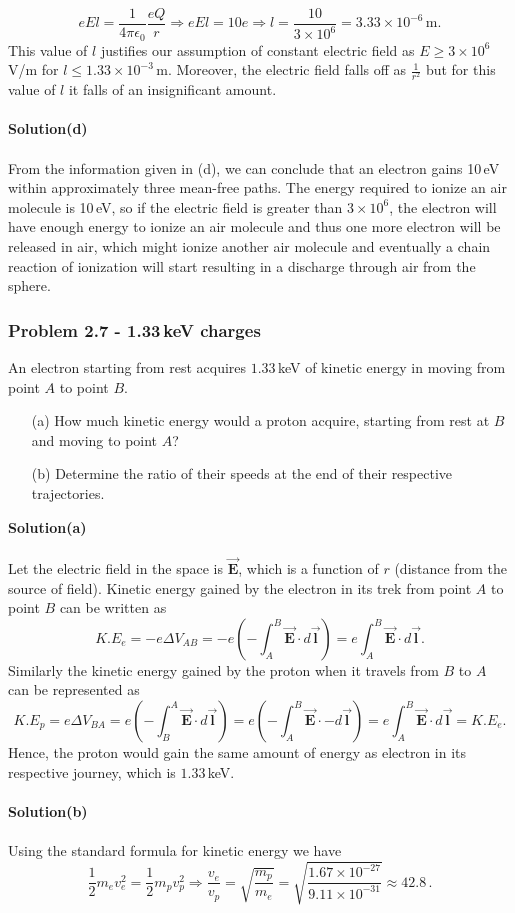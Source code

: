 \documentclass{article}
\begin{document}
\[eEl=\frac{1}{4\pi\epsilon_0}\frac{eQ}{r}\Rightarrow eEl=10e\Rightarrow l=\frac{10}{3\times10^6}=3.33\times10^{-6}\,\text{m}.\]
This value of $l$ justifies our assumption of constant electric field as $E\geq 3\times10^6\,$V/m for $l\leq1.33\times10^{-3}\,$m.
Moreover, the electric field falls off as $\frac{1}{r^2}$ but for this value of $l$ it falls of an insignificant amount.
\\
\\\textbf{Solution(d)}
\\
\\From the information given in (d), we can conclude that an electron gains 10\,eV within approximately three mean-free paths.
The energy required to ionize an air molecule is 10\,eV, so if the electric field is greater than $3\times10^6$, the electron will have enough energy to ionize an air molecule and thus one more electron will be released in air, which might ionize another air molecule and eventually a chain reaction of ionization will start resulting in a discharge through air from the sphere.   

\subsubsection*{Problem 2.7 - 1.33\,keV charges}
An electron starting from rest acquires $1.33$\,keV of
kinetic energy in moving from point $A$ to point $B$.
\begin{enumerate}
    \item[(a)]How much kinetic energy would a proton acquire, starting from rest at $B$ and moving to point $A$? 
    \item[(b)]Determine the ratio of their speeds at the end of their respective trajectories.
\end{enumerate}
\textbf{Solution(a)}
\\
\\Let the electric field in the space is $\Vec{\boldsymbol{E}}$, which is a function of $r$ (distance from the source of field). Kinetic energy gained by the electron in its trek from point $A$ to point $B$ can be written as
\[K.E_e=-e\Delta V_{AB}=-e\left(-\int_{A}^{B}\Vec{\boldsymbol{E}}\cdot d\Vec{\boldsymbol{l}}\right)=e\int_{A}^{B}\Vec{\boldsymbol{E}}\cdot d\Vec{\boldsymbol{l}}.\]
Similarly the kinetic energy gained by the proton when it travels from $B$ to $A$ can be represented as
\[K.E_p=e\Delta V_{BA}=e\left(-\int_{B}^{A}\Vec{\boldsymbol{E}}\cdot d\Vec{\boldsymbol{l}}\right)=e\left(-\int_{A}^{B}\Vec{\boldsymbol{E}}\cdot-d\Vec{\boldsymbol{l}}\right)=e\int_{A}^{B}\Vec{\boldsymbol{E}}\cdot d\Vec{\boldsymbol{l}}=K.E_e.\]
Hence, the proton would gain the same amount of energy as electron in its respective journey, which is $1.33$\,keV.
\\
\\\textbf{Solution(b)}
\\
\\Using the standard formula for kinetic energy we have
\[\frac{1}{2}m_ev_e^2=\frac{1}{2}m_pv_p^2\Rightarrow\frac{v_e}{v_p}=\sqrt{\frac{m_p}{m_e}}=\sqrt{\frac{1.67\times10^{-27}}{9.11\times10^{-31}}}\approx42.8\,.\]
\end{document}
